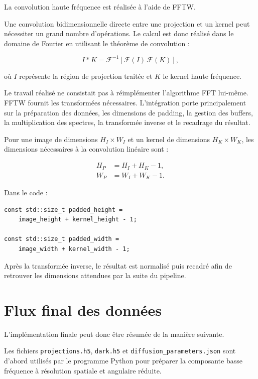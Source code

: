 \documentclass[11pt,a4paper]{report}
\begin{document}
La convolution haute fréquence est réalisée à l'aide de FFTW.

Une convolution bidimensionnelle directe entre une projection et un kernel
peut nécessiter un grand nombre d'opérations. Le calcul est donc réalisé
dans le domaine de Fourier en utilisant le théorème de convolution :

\begin{equation}
I*K
=
\mathcal{F}^{-1}
\left[
\mathcal{F}(I)\,
\mathcal{F}(K)
\right],
\end{equation}

où $I$ représente la région de projection traitée et $K$ le kernel haute
fréquence.

Le travail réalisé ne consistait pas à réimplémenter l'algorithme FFT
lui-même. FFTW fournit les transformées nécessaires. L'intégration porte
principalement sur la préparation des données, les dimensions de padding,
la gestion des buffers, la multiplication des spectres, la transformée
inverse et le recadrage du résultat.

Pour une image de dimensions $H_I\times W_I$ et un kernel de dimensions
$H_K\times W_K$, les dimensions nécessaires à la convolution linéaire sont :

\begin{align}
H_P &= H_I + H_K - 1,\\
W_P &= W_I + W_K - 1.
\end{align}

Dans le code :

\begin{verbatim}
const std::size_t padded_height =
    image_height + kernel_height - 1;

const std::size_t padded_width =
    image_width + kernel_width - 1;
\end{verbatim}

Après la transformée inverse, le résultat est normalisé puis recadré afin
de retrouver les dimensions attendues par la suite du pipeline.

\section{Flux final des données}

L'implémentation finale peut donc être résumée de la manière suivante.

Les fichiers \texttt{projections.h5}, \texttt{dark.h5} et
\texttt{diffusion\_parameters.json} sont d'abord utilisés par le programme
Python pour préparer la composante basse fréquence à résolution spatiale et
angulaire réduite.
\end{document}
